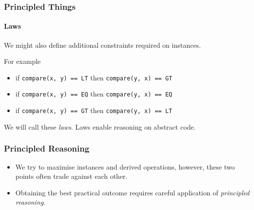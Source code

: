 \begin{frame}
\frametitle{Principled Things}
\framesubtitle{Laws}
We might also define additional constraints required on instances.
\begin{block}{For example}
\begin{itemize}
\item if \lstinline{compare(x, y) == LT} then \lstinline{compare(y, x) == GT}
\item if \lstinline{compare(x, y) == EQ} then \lstinline{compare(y, x) == EQ}
\item if \lstinline{compare(x, y) == GT} then \lstinline{compare(y, x) == LT}
\end{itemize}
\end{block}
We will call these \emph{laws}. Laws enable reasoning on abstract code.
\end{frame}

\begin{frame}
\frametitle{Principled Reasoning}
\begin{itemize}
\item We try to maximise instances and derived operations, however, these two points often trade against each other.
\item Obtaining the best practical outcome requires careful application of \emph{principled reasoning}.
\end{itemize}
\end{frame}
